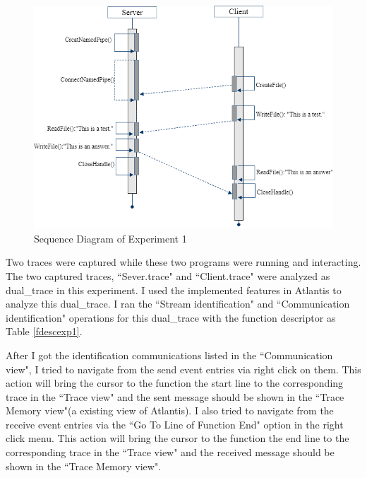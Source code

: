 \begin{figure}[H]
\centerline{\includegraphics[scale=0.7]{Figures/exp1}}
 \caption{Sequence Diagram of Experiment 1}
\label{exp1}
\end{figure}

Two traces were captured while these two programs were running and interacting. The two captured traces, ``Sever.trace" and ``Client.trace" were analyzed as dual\_trace in this experiment. I used the implemented features in Atlantis to analyze this dual\_trace. I ran the ``Stream identification" and ``Communication identification" operations for this dual\_trace with the function descriptor as Table \ref{fdescexp1}.

After I got the identification communications listed in the ``Communication view", I tried to navigate from the send event entries via right click on them. This action will bring the cursor to the function the start line to the corresponding trace in the ``Trace view" and the sent message should be shown in the ``Trace Memory view"(a existing view of Atlantis). I also tried to navigate from the receive event entries via the ``Go To Line of Function End" option in the right click menu. This action will bring the cursor to the function the end line to the corresponding trace in the ``Trace view" and the received message should be shown in the ``Trace Memory view".

